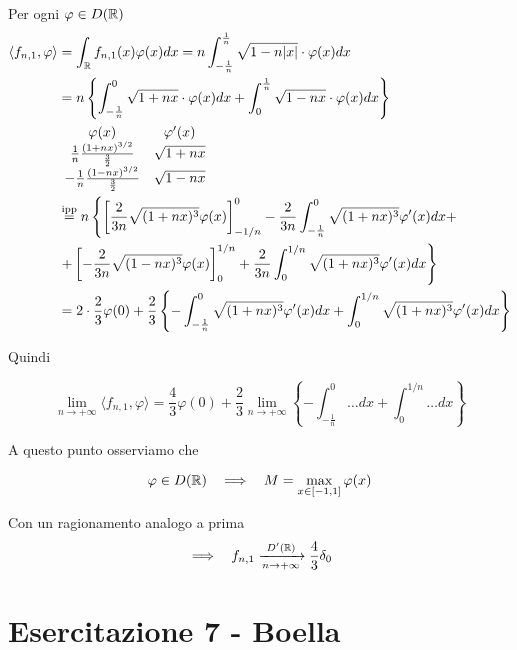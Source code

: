 \begin{enumerate}
Per ogni $\varphi \in D(\mathbb{R})$\begin{align*}
\langle f_{n,1} ,\varphi \rangle  & = \int _{\mathbb{R} } f_{n,1}(x) \varphi (x) dx = n\int ^{\frac{1}{n}}_{ - \frac{1}{n}}\sqrt{1 - n| x| } \cdot \varphi (x) dx\\
 & = n\left\{\int ^{0}_{ - \frac{1}{n}}\sqrt{1 + nx} \cdot \varphi (x) dx + \int ^{\frac{1}{n}}_{0}\sqrt{1 - nx} \cdot \varphi (x) dx\right\}\\
 & \begin{array}{ c c }
\varphi (x) & \varphi '(x)\\
\frac{1}{n}\frac{(1 + nx)^{3/2}}{\frac{3}{2}} & \sqrt{1 + nx}\\
- \frac{1}{n}\frac{(1 - nx)^{3/2}}{\frac{3}{2}} & \sqrt{1 - nx}
\end{array}\\
 & \overset{\text{ipp}}{ = } n\left\{\left[\frac{2}{3n}\sqrt{(1 + nx)^{3}} \varphi (x)\right]^{0}_{ - 1/n} - \frac{2}{3n}\int ^{0}_{ - \frac{1}{n}}\sqrt{(1 + nx)^{3}} \varphi '(x)dx + \right. \\
 & \left. + \left[ - \frac{2}{3n}\sqrt{(1 - nx)^{3}} \varphi (x)\right]^{1/n}_{0} + \frac{2}{3n}\int ^{1/n}_{0}\sqrt{(1 + nx)^{3}} \varphi '(x)dx\right\}\\
 & = 2\cdot \frac{2}{3} \varphi (0) + \frac{2}{3}\left\{ - \int ^{0}_{ - \frac{1}{n}}\sqrt{(1 + nx)^{3}} \varphi '(x)dx + \int ^{1/n}_{0}\sqrt{(1 + nx)^{3}} \varphi '(x)dx\right\}
\end{align*}

Quindi

\begin{equation*}
\lim\limits _{n\rightarrow + \infty } \langle f_{n,1} ,\varphi \rangle = \frac{4}{3} \varphi (0) + \frac{2}{3}\lim\limits _{n\rightarrow + \infty }\left\{ - \int ^{0}_{ - \frac{1}{n}} \dotsc dx + \int ^{1/n}_{0} \dotsc dx\right\}
\end{equation*}

A questo punto osserviamo che

\begin{equation*}
\varphi \in D(\mathbb{R}) \ \ \implies \ \ M = \max_{x\in [ - 1,1]} \varphi (x)
\end{equation*}

Con un ragionamento analogo a prima\begin{equation*}
\implies \ \ f_{n,1}\xrightarrow[n\rightarrow + \infty ]{D'(\mathbb{R})}\frac{4}{3} \delta _{0}
\end{equation*}
\end{enumerate}
\chapter{Esercitazione 7 - Boella}
\ParteEsercizi
\Esercizio{}


